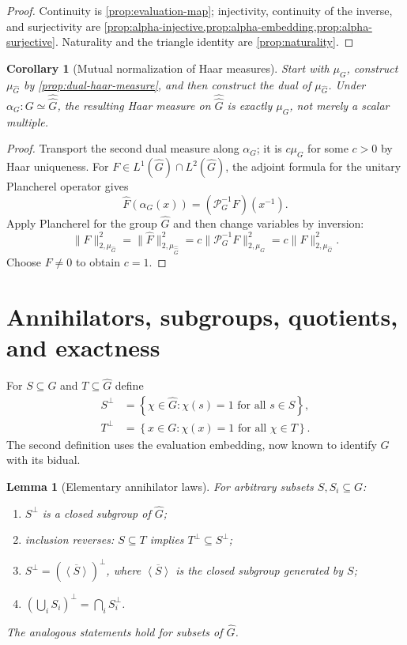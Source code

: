 \documentclass[11pt]{article}
\newtheorem{lemma}[theorem]{Lemma}
\newtheorem{corollary}[theorem]{Corollary}
\theoremstyle{definition}
\theoremstyle{remark}
\newcommand{\Lp}[1]{L^{#1}}
\newcommand{\dual}[1]{\widehat{#1}}
\newcommand{\bidual}[1]{\widehat{\widehat{#1}}}
\newcommand{\norm}[1]{\lVert #1\rVert}
\newcommand{\set}[1]{\left\{#1\right\}}
\newcommand{\angles}[1]{\left\langle #1\right\rangle}
\begin{document}
\begin{proof}
Continuity is \cref{prop:evaluation-map}; injectivity, continuity of the inverse, and
surjectivity are
\cref{prop:alpha-injective,prop:alpha-embedding,prop:alpha-surjective}.  Naturality and
the triangle identity are \cref{prop:naturality}.
\end{proof}

\begin{corollary}[Mutual normalization of Haar measures]
\label{cor:mutual-haar-normalization}
Start with $\mu_G$, construct $\mu_{\dual G}$ by
\cref{prop:dual-haar-measure}, and then construct the dual of $\mu_{\dual G}$.  Under
$\alpha_G:G\simeq\bidual G$, the resulting Haar measure on $\bidual G$ is exactly
$\mu_G$, not merely a scalar multiple.
\end{corollary}

\begin{proof}
Transport the second dual measure along $\alpha_G$; it is $c\mu_G$ for some $c>0$ by
Haar uniqueness.  For $F\in\Lp1(\dual G)\cap\Lp2(\dual G)$, the adjoint formula for the
unitary Plancherel operator gives
\[
  \widehat F(\alpha_G(x))=(\mathcal P_G^{-1}F)(x^{-1}).
\]
Apply Plancherel for the group $\dual G$ and then change variables by inversion:
\[
 \norm F_{2,\mu_{\dual G}}^2
 =\norm{\widehat F}_{2,\mu_{\bidual G}}^2
 =c\norm{\mathcal P_G^{-1}F}_{2,\mu_G}^2
 =c\norm F_{2,\mu_{\dual G}}^2.
\]
Choose $F\neq0$ to obtain $c=1$.
\end{proof}

\section{Annihilators, subgroups, quotients, and exactness}
\label{sec:annihilators}

For $S\subseteq G$ and $T\subseteq\dual G$ define
\begin{align*}
 S^\perp&=\set{\chi\in\dual G:\chi(s)=1\text{ for all }s\in S},\\
 T^\perp&=\set{x\in G:\chi(x)=1\text{ for all }\chi\in T}.
\end{align*}
The second definition uses the evaluation embedding, now known to identify $G$ with its
bidual.

\begin{lemma}[Elementary annihilator laws]
\label{lem:annihilator-elementary}
For arbitrary subsets $S,S_i\subseteq G$:
\begin{enumerate}[label=(\alph*)]
\item $S^\perp$ is a closed subgroup of $\dual G$;
\item inclusion reverses: $S\subseteq T$ implies $T^\perp\subseteq S^\perp$;
\item $S^\perp=(\overline{\angles S})^\perp$, where $\overline{\angles S}$ is the
closed subgroup generated by $S$;
\item $(\bigcup_iS_i)^\perp=\bigcap_iS_i^\perp$.
\end{enumerate}
The analogous statements hold for subsets of $\dual G$.
\end{lemma}
\end{document}
